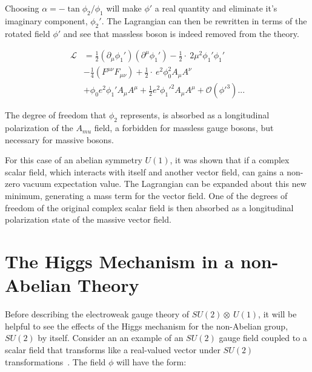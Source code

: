 \noindent Choosing $\alpha = -\tan{\phi_{2}/\phi_{1}}$ will make $\phi'$
 a real quantity and eliminate it's imaginary component, $\phi_{2}'$.
 The Lagrangian can then be rewritten in terms of the rotated field
 $\phi'$ and see that massless boson is indeed removed from the
 theory.

\begin{equation}\label{eq:abelian_higgs_mechanism_final_lagrangian}
\begin{aligned}
\mathcal{L} & =
\frac{1}{2}(\partial_{\mu}\phi_{1}')(\partial^{\mu}\phi_{1}') -
\frac{1}{2}\cdot~2\mu^{2}\phi_{1}'\phi_{1}' \\
&  -\frac{1}{4}(F^{\mu\nu}F_{\mu\nu}) +
\frac{1}{2}\cdot~e^{2}\phi_{0}^{2}A_{\mu}A^{\nu} \\
&  + \phi_{0}e^{2}\phi_{1}'A_{\mu}A^{\mu} +
\frac{1}{2}e^2\phi_{1}'^{2}A_{\mu}A^{\mu} + \mathcal{O}(\phi'^{3})...
\end{aligned}
\end{equation}

\par The degree of freedom that $\phi_{2}$ represents, is absorbed as
a longitudinal polarization of the $A_{mu}$ field, a forbidden for
massless gauge bosons, but necessary for massive bosons.  

\par For this case of an abelian symmetry $U(1)$, it was shown that if a
complex scalar field, which interacts with itself and another vector
field, can gains a non-zero vacuum expectation value.  The Lagrangian can
be expanded about this new minimum, generating a mass term for the
vector field.  One of the degrees of freedom of the original complex
scalar field is then absorbed as a longitudinal polarization state of
the massive vector field.  

\section{The Higgs Mechanism in a non-Abelian Theory}
\label{non_abelian_higgs_mechanism_overview}

\par Before describing the electroweak gauge theory of
$SU(2)\otimes~U(1)$, it will be helpful to see the effects of the
Higgs mechanism for the non-Abelian group, $SU(2)$ by itself.  Consider an
an example of an $SU(2)$ gauge field coupled to a scalar field that
transforms like a real-valued vector under $SU(2)$
transformations~\cite{Peskin_Schroeder}.  The field $\phi$ will have
the form:

